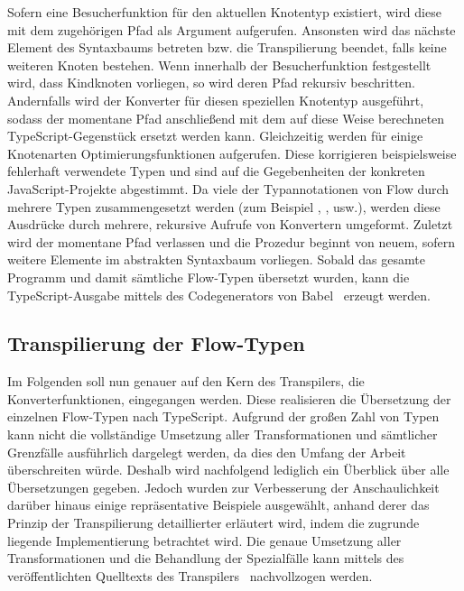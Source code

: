 Sofern eine Besucherfunktion für den aktuellen Knotentyp existiert, wird diese mit dem zugehörigen Pfad als Argument aufgerufen. Ansonsten wird das nächste Element des Syntaxbaums betreten bzw. die Transpilierung beendet, falls keine weiteren Knoten bestehen. Wenn innerhalb der Besucherfunktion festgestellt wird, dass Kindknoten vorliegen, so wird deren Pfad rekursiv beschritten. Andernfalls wird der Konverter für diesen speziellen Knotentyp ausgeführt, sodass der momentane Pfad anschließend mit dem auf diese Weise berechneten TypeScript-Gegenstück ersetzt werden kann. Gleichzeitig werden für einige Knotenarten Optimierungsfunktionen aufgerufen. Diese korrigieren beispielsweise fehlerhaft verwendete Typen und sind auf die Gegebenheiten der konkreten JavaScript-Projekte abgestimmt. Da viele der Typannotationen von Flow durch mehrere Typen zusammengesetzt werden (zum Beispiel , , usw.), werden diese Ausdrücke durch mehrere, rekursive Aufrufe von Konvertern umgeformt. Zuletzt wird der momentane Pfad verlassen und die Prozedur beginnt von neuem, sofern weitere Elemente im abstrakten Syntaxbaum vorliegen. Sobald das gesamte Programm und damit sämtliche Flow-Typen übersetzt wurden, kann die TypeScript-Ausgabe mittels des Codegenerators von Babel~\autocite{BABEL:GENERATOR} erzeugt werden.

\subsection{Transpilierung der Flow-Typen}
\label{sec:flow-transpilation}

Im Folgenden soll nun genauer auf den Kern des Transpilers, die Konverterfunktionen, eingegangen werden. Diese realisieren die Übersetzung der einzelnen Flow-Typen nach TypeScript. Aufgrund der großen Zahl von Typen kann nicht die vollständige Umsetzung aller Transformationen und sämtlicher Grenzfälle ausführlich dargelegt werden, da dies den Umfang der Arbeit überschreiten würde. Deshalb wird nachfolgend lediglich ein Überblick über alle Übersetzungen gegeben. Jedoch wurden zur Verbesserung der Anschaulichkeit darüber hinaus einige repräsentative Beispiele ausgewählt, anhand derer das Prinzip der Transpilierung detaillierter erläutert wird, indem die zugrunde liegende Implementierung betrachtet wird. Die genaue Umsetzung aller Transformationen und die Behandlung der Spezialfälle kann mittels des veröffentlichten Quelltexts des Transpilers~\autocite{REFLOW_GITHUB} nachvollzogen werden.

